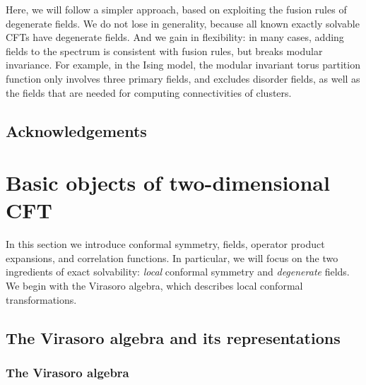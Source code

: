 \documentclass[12pt, a4paper]{article}
\theoremstyle{break}
\begin{document}
Here, we will follow a simpler approach, based on exploiting the fusion rules of degenerate fields. We do not lose in generality, because all known exactly solvable CFTs have degenerate fields. And we gain in flexibility: in many cases, adding fields to the spectrum is consistent with fusion rules, but breaks modular invariance. For example, in the Ising model, the modular invariant torus partition function only involves three primary fields, and excludes disorder fields, as well as the fields that are needed for computing connectivities of clusters.


\subsection*{Acknowledgements}



\section{Basic objects of two-dimensional CFT}\label{sec:bo}

In this section we introduce conformal symmetry, fields, operator product expansions, and correlation functions. In particular, we will focus on the two ingredients of exact solvability: \textit{local} conformal symmetry and \textit{degenerate} fields. We begin with the Virasoro algebra, which describes local conformal transformations. 

\subsection{The Virasoro algebra and its representations}\label{sec:vir}

\subsubsection{The Virasoro algebra}
\end{document}
